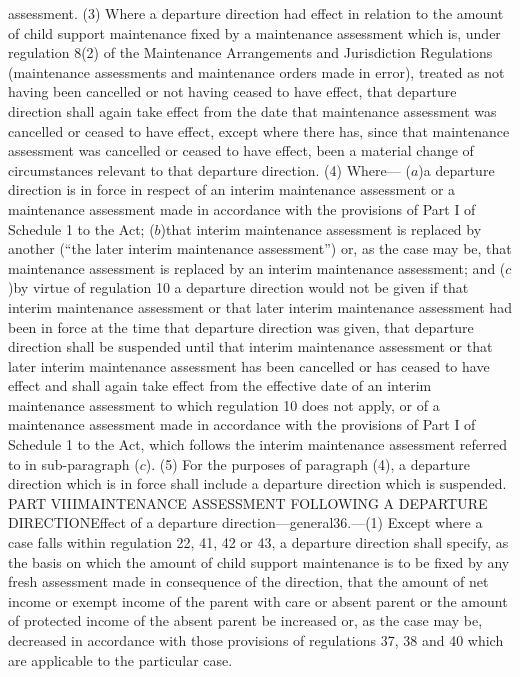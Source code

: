 \documentclass[a4paper]{article}
\begin{document}
assessment.
(3) Where a departure direction had effect in relation to the amount of child
support maintenance fixed by a maintenance assessment which is, under regulation
8(2) of the Maintenance Arrangements and Jurisdiction Regulations (maintenance
assessments and maintenance orders made in error), treated as not having been
cancelled or not having ceased to have effect, that departure direction shall
again take effect from the date that maintenance assessment was cancelled or
ceased to have effect, except where there has, since that maintenance assessment
was cancelled or ceased to have effect, been a material change of circumstances
relevant to that departure direction.
(4) Where—
($a$)a departure direction is in force in respect of an interim maintenance
assessment or a maintenance assessment made in accordance with the provisions of
Part I of Schedule 1 to the Act;
($b$)that interim maintenance assessment is replaced by another (“the later
interim maintenance assessment”) or, as the case may be, that maintenance
assessment is replaced by an interim maintenance assessment; and
($c$)by virtue of regulation 10 a departure direction would not be given if that
interim maintenance assessment or that later interim maintenance assessment had
been in force at the time that departure direction was given, that departure
direction shall be suspended until that interim maintenance assessment or that
later interim maintenance assessment has been cancelled or has ceased to have
effect and shall again take effect from the effective date of an interim
maintenance assessment to which regulation 10 does not apply, or of a
maintenance assessment made in accordance with the provisions of Part I of
Schedule 1 to the Act, which follows the interim maintenance assessment referred
to in sub-paragraph ($c$).
(5) For the purposes of paragraph (4), a departure direction which is in force
shall include a departure direction which is suspended.
PART VIIIMAINTENANCE ASSESSMENT FOLLOWING A DEPARTURE DIRECTIONEffect of a
departure direction—general36.—(1) Except where a case falls within regulation
22, 41, 42 or 43, a departure direction shall specify, as the basis on which the
amount of child support maintenance is to be fixed by any fresh assessment made
in consequence of the direction, that the amount of net income or exempt income
of the parent with care or absent parent or the amount of protected income of
the absent parent be increased or, as the case may be, decreased in accordance
with those provisions of regulations 37, 38 and 40 which are applicable to the
particular case.
\end{document}
